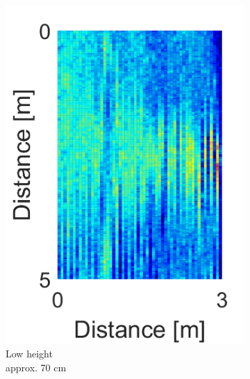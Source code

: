 \begin{figure}[H]
\captionsetup{belowskip=0em}
\centering
\begin{subfigure}[b]{0.29\textwidth}
\includegraphics[width=\textwidth]{figures/Not_Norm_space_1.png}
\caption{Low height \\ approx. 70 cm}
\label{Not_norm_low}
\end{subfigure}
\begin{subfigure}[b]{0.29\textwidth}

\end{subfigure}
\end{figure}
